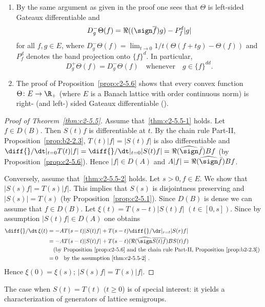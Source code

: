 \begin{remark}\label{rem:c2-5.7} 

\begin{enumerate}[\upshape (i), wide, labelindent=.25em] %
\item \label{rem:c2-5.7-1}
By the same argument as given in the proof one sees
that $\Theta$ is left-sided Gateaux differentiable and
\begin{equation*}
D^{-}_{g}\Theta(f) = \Re((\sign  \overline{f})g) - P^{d}_{f}|g|
\end{equation*}
for all $f, g \in E$, where $D^{-}_{g}\Theta(f) = \lim_{t \to 0} 1/t(\Theta(f + tg) - \Theta(f))$ and
$P^{d}_{f}$ denotes the band projection onto $\{f\}^{d}$. 
In particular,
\begin{equation}\label{eq:c2-5.10}
D^{+}_{g}\Theta(f) = D^{-}_{g}\Theta(f) \quad \text{whenever} \quad g \in \{f\}^{dd}.
\end{equation}
\item \label{rem:c2-5.7-2}
The proof of  Proposition~\ref{prop:c2-5.6}   shows that every convex function $\Theta \colon E \to \R_{+}$
(where $E$ is a Banach lattice with order continuous norm) is right- (and left-) sided Gateaux differentiable (\cf \textcite{ arendt:1982}).
\end{enumerate}
\end{remark}
\begin{proof}[Proof of Theorem~\ref{thm:c2-5.5}]
Assume that~\ref{thm:c2-5.5-1}   holds. 
Let $f \in D(B)$. 
Then $S(t)f$ is differentiable at $t$. 
By the chain rule Part-II, Proposition~\ref{prop:b2-2.3},
$T(t)|f| = |S(t)f|$ is also differentiable and $\diff{}/\dt|_{t=0} T(t)|f| = \diff{}/\dt|_{t=0} |S(t)f| = \Re(\widehat{\sign}  \bar{f})Bf$ (by  Proposition~\ref{prop:c2-5.6}).
Hence $|f| \in D(A)$ and $A|f| = \Re(\widehat{\sign}  \bar{f})Bf$.

Conversely, assume that~\ref{thm:c2-5.5-2}   holds. 
Let $s > 0, f \in E$. 
We show that $|S(s)f| = T(s)|f|$. 
This implies that $S(s)$ is disjointness preserving and $|S(s)| = T(s)$ (by Proposition~\ref{prop:c2-5.1}). 
Since $D(B)$ is dense we can assume that $f \in D(B)$. 
Let $\xi(t) = T(s-t)|S(t)f|$ $(t \in [0,s])$.
Since by assumption $|S(t)f| \in D(A)$ one obtains
\begin{align*}
\diff{}/\dt \, \xi(t) &= -AT(s-t)|S(t)f| + T(s-t)\diff{}/\dr|_{r=t} |S(r)f|\\
&= -AT(s-t)|S(t)f| + T(s-t)(\Re(\widehat{\sign}  \overline{S(t)f})BS(t)f)\\
&\quad \text{(by  Proposition~\ref{prop:c2-5.6}   and the chain rule Part-II, Proposition~\ref{prop:b2-2.3})
}\\
&= 0 \quad \text{by the assumption~\ref{thm:c2-5.5-2}  }.
\end{align*}
Hence $\xi(0) = \xi(s)$; \ie $|S(s)f| = T(s)|f|$.
\end{proof}
The case when $S(t) = T(t)$ $(t \geq 0$) is of special interest: it yields a characterization of generators of lattice semigroups.

